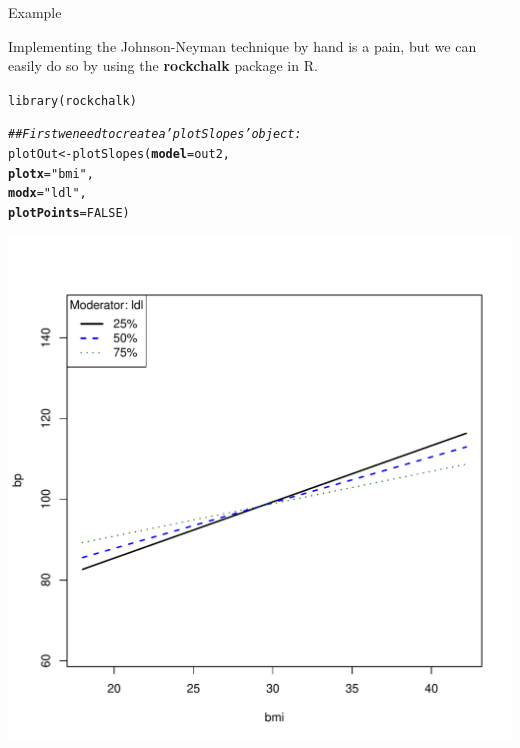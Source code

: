 \documentclass{beamer}\usepackage[]{graphicx}\usepackage[]{color}
\makeatletter
\newcommand{\hlnum}[1]{\textcolor[rgb]{0.69,0.494,0}{#1}}%
\newcommand{\hlstr}[1]{\textcolor[rgb]{0.749,0.012,0.012}{#1}}%
\newcommand{\hlcom}[1]{\textcolor[rgb]{0.514,0.506,0.514}{\textit{#1}}}%
\newcommand{\hlstd}[1]{\textcolor[rgb]{0,0,0}{#1}}%
\newcommand{\hlkwb}[1]{\textcolor[rgb]{0,0.341,0.682}{#1}}%
\newcommand{\hlkwc}[1]{\textcolor[rgb]{0,0,0}{\textbf{#1}}}%
\newcommand{\hlkwd}[1]{\textcolor[rgb]{0.004,0.004,0.506}{#1}}%
\newenvironment{kframe}{%
 \def\at@end@of@kframe{}%
 \ifinner\ifhmode%
  \def\at@end@of@kframe{\end{minipage}}%
  \begin{minipage}{\columnwidth}%
 \fi\fi%
 \def\FrameCommand##1{\hskip\@totalleftmargin \hskip-\fboxsep
 \colorbox{shadecolor}{##1}\hskip-\fboxsep
     \hskip-\linewidth \hskip-\@totalleftmargin \hskip\columnwidth}%
 \MakeFramed {\advance\hsize-\width
   \@totalleftmargin\z@ \linewidth\hsize
   \@setminipage}}%
 {\par\unskip\endMakeFramed%
 \at@end@of@kframe}
\newenvironment{knitrout}{}{} %
\makeatother
\begin{document}
\begin{frame}{Example}
  
  Implementing the Johnson-Neyman technique by hand is a pain, but we can easily 
  do so by using the \textbf{rockchalk} package in \textsf{R}.\\ 
  
  \vb
  
\begin{knitrout}\footnotesize
{}\color{fgcolor}\begin{kframe}
\begin{alltt}
\hlkwd{library}\hlstd{(rockchalk)}

\hlcom{## First we need to create a 'plotSlopes' object:}
\hlstd{plotOut} \hlkwb{<-} \hlkwd{plotSlopes}\hlstd{(}\hlkwc{model}      \hlstd{= out2,}
                      \hlkwc{plotx}      \hlstd{=} \hlstr{"bmi"}\hlstd{,}
                      \hlkwc{modx}       \hlstd{=} \hlstr{"ldl"}\hlstd{,}
                      \hlkwc{plotPoints} \hlstd{=} \hlnum{FALSE}\hlstd{)}
\end{alltt}
\end{kframe}

{\centering \includegraphics[width=0.65\linewidth]{figure/unnamed-chunk-15-1} 

}



\end{knitrout}

\end{frame}

\end{document}
